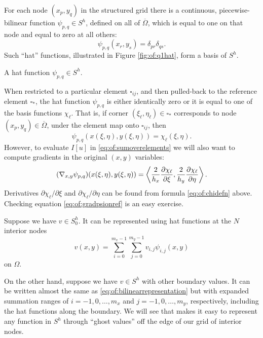 For each node $(x_p,y_q)$ in the structured grid there is a continuous, piecewise-bilinear function $\psi_{p,q} \in S^h$, defined on all of $\overline\Omega$, which is equal to one on that node and equal to zero at all others:
\begin{equation}
  \psi_{p,q}(x_r,y_s) = \delta_{pr} \delta_{qs}.  \label{eq:of:psinodewise}
\end{equation}
Such ``hat'' functions, illustrated in Figure \ref{fig:of:q1hat}, form a basis of $S^h$.

\begin{marginfigure}

\caption{A hat function $\psi_{p,q} \in S^h$.}
\label{fig:of:q1hat}
\end{marginfigure}

When restricted to a particular element $\square_{ij}$, and then pulled-back to the reference element $\square_\ast$, the hat function $\psi_{p,q}$ is either identically zero or it is equal to one of the basis functions $\chi_\ell$.  That is, if corner $(\xi_\ell,\eta_\ell) \in \square_\ast$ corresponds to node $(x_p,y_q) \in \overline\Omega$, under the element map onto $\square_{ij}$, then
\begin{equation}
  \psi_{p,q}(x(\xi,\eta),y(\xi,\eta)) = \chi_\ell(\xi,\eta).  \label{eq:of:psionref}
\end{equation}
However, to evaluate $I[u]$ in \eqref{eq:of:sumoverelements} we will also want to compute gradients in the original $(x,y)$ variables:
\begin{equation}
  (\nabla_{x,y} \psi_{p,q})(x(\xi,\eta),y(\xi,\eta)) = \left<\frac{2}{h_x}\frac{\partial\chi_\ell}{\partial \xi},\frac{2}{h_y}\frac{\partial\chi_\ell}{\partial \eta}\right>.   \label{eq:of:gradpsionref}
\end{equation}
Derivatives $\partial\chi_\ell/\partial \xi$ and $\partial\chi_\ell/\partial \eta$ can be found from formula \eqref{eq:of:chidefn} above.  Checking equation \eqref{eq:of:gradpsionref} is an easy exercise.

Suppose we have $v \in S_0^h$.  It can be represented using hat functions at the $N$ interior nodes
\begin{equation}
v(x,y) = \sum_{i=0}^{m_x-1} \sum_{j=0}^{m_y-1} v_{i,j} \psi_{i,j}(x,y) \label{eq:of:bilinearrepresentation}
\end{equation}
on $\Omega$.

On the other hand, suppose we have $v \in S^h$ with other boundary values.  It can be written almost the same as \eqref{eq:of:bilinearrepresentation} but with expanded summation ranges of $i=-1,0,\dots,m_x$ and $j=-1,0,\dots,m_y$, respectively, including the hat functions along the boundary.  We will see that \PETSc makes it easy to represent any function in $S^h$ through ``ghost values'' off the edge of our grid of interior nodes.

